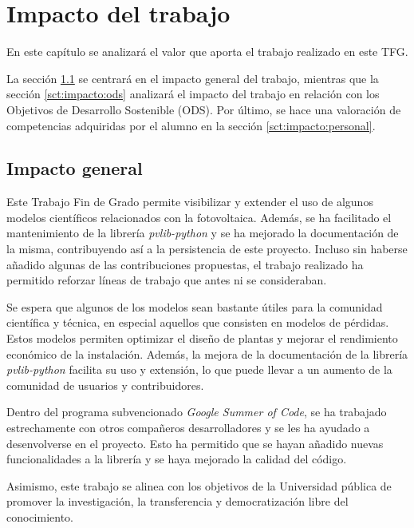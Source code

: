 \chapter{Impacto del trabajo} \label{chp:impacto}

En este capítulo se analizará el valor que aporta el trabajo realizado en este TFG.

La sección \ref{sct:impacto:general} se centrará en el impacto general del trabajo, mientras que la sección \ref{sct:impacto:ods} analizará el impacto del trabajo en relación con los Objetivos de Desarrollo Sostenible (ODS). Por último, se hace una valoración de competencias adquiridas por el alumno en la sección \ref{sct:impacto:personal}.


\section{Impacto general} \label{sct:impacto:general}

Este Trabajo Fin de Grado permite visibilizar y extender el uso de algunos modelos científicos relacionados con la fotovoltaica. Además, se ha facilitado el mantenimiento de la librería \textit{pvlib-python} y se ha mejorado la documentación de la misma, contribuyendo así a la persistencia de este proyecto. Incluso sin haberse añadido algunas de las contribuciones propuestas, el trabajo realizado ha permitido reforzar líneas de trabajo que antes ni se consideraban.

Se espera que algunos de los modelos sean bastante útiles para la comunidad científica y técnica, en especial aquellos que consisten en modelos de pérdidas. Estos modelos permiten optimizar el diseño de plantas y mejorar el rendimiento económico de la instalación. Además, la mejora de la documentación de la librería \textit{pvlib-python} facilita su uso y extensión, lo que puede llevar a un aumento de la comunidad de usuarios y contribuidores.

Dentro del programa subvencionado \textit{Google Summer of Code}, se ha trabajado estrechamente con otros compañeros desarrolladores y se les ha ayudado a desenvolverse en el proyecto. Esto ha permitido que se hayan añadido nuevas funcionalidades a la librería y se haya mejorado la calidad del código.

Asimismo, este trabajo se alinea con los objetivos de la Universidad pública de promover la investigación, la transferencia y democratización libre del conocimiento.

